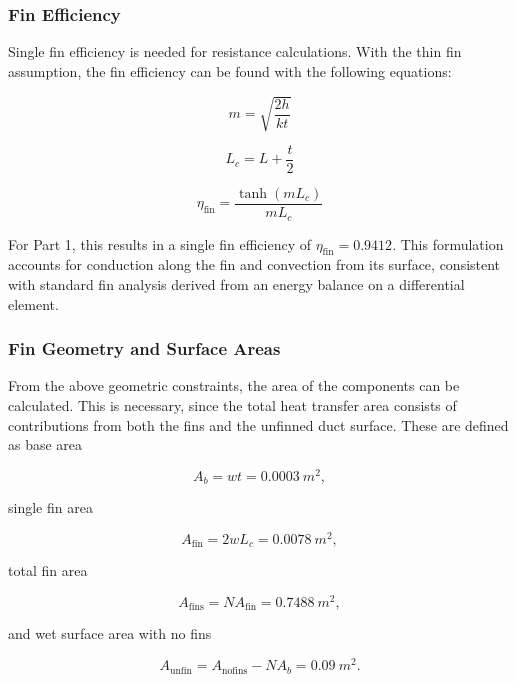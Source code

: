 \documentclass[12pt, titlepage]{article}
\begin{document}
\subsubsection{Fin Efficiency}

Single fin efficiency is needed for resistance calculations. With the thin fin assumption, the fin efficiency can be found with the following equations:

\begin{equation}
m = \sqrt{\frac{2h}{kt}}
\end{equation}

\begin{equation}
L_c = L + \frac{t}{2}
\end{equation}

\begin{equation}
\eta_{\text{fin}} = \frac{\tanh(mL_c)}{mL_c}
\end{equation}

For Part 1, this results in a single fin efficiency of $\eta_{\text{fin}} =  0.9412$. This formulation accounts for conduction along the fin and convection from its surface, consistent with standard fin analysis derived from an energy balance on a differential element.

\subsubsection{Fin Geometry and Surface Areas}

From the above geometric constraints, the area of the components can be calculated. This is necessary, since the total heat transfer area consists of contributions from both the fins and the unfinned duct surface. These are defined as base area

\begin{equation}
A_b = wt = 0.0003\ m^2,
\end{equation}

single fin area

\begin{equation}
A_{\text{fin}} = 2wL_c = 0.0078\ m^2,
\end{equation}

total fin area

\begin{equation}
A_{\text{fins}} = N A_{\text{fin}} = 0.7488\ m^2,
\end{equation}

and wet surface area with no fins

\begin{equation}
A_{\text{unfin}} = A_{\text{nofins}} - N A_b = 0.09\ m^2.
\end{equation}
\end{document}
